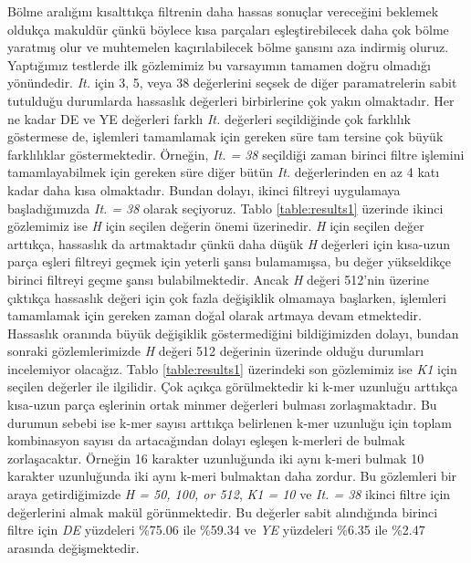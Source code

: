 Bölme aralığını kısalttıkça filtrenin daha hassas sonuçlar vereceğini beklemek oldukça makuldür çünkü böylece kısa parçaları eşleştirebilecek daha çok bölme yaratmış olur ve muhtemelen kaçırılabilecek bölme şansını aza indirmiş oluruz. Yaptığımız testlerde ilk gözlemimiz bu varsayımın tamamen doğru olmadığı yönündedir. \textit{It.} için 3, 5, veya 38 değerlerini seçsek de diğer paramatrelerin sabit tutulduğu durumlarda hassaslık değerleri birbirlerine çok yakın olmaktadır. Her ne kadar DE ve YE değerleri farklı \textit{It.} değerleri seçildiğinde çok farklılık göstermese de, işlemleri tamamlamak için gereken süre tam tersine çok büyük farklılıklar göstermektedir. Örneğin, \textit{It. = 38} seçildiği zaman birinci filtre işlemini tamamlayabilmek için gereken süre diğer bütün \textit{It.} değerlerinden en az 4 katı kadar daha kısa olmaktadır. Bundan dolayı, ikinci filtreyi uygulamaya başladığımızda \textit{It. = 38} olarak seçiyoruz. Tablo \ref{table:results1} üzerinde ikinci gözlemimiz ise \textit{H} için seçilen değerin önemi üzerinedir. \textit{H} için seçilen değer arttıkça, hassaslık da artmaktadır çünkü daha düşük \textit{H} değerleri için kısa-uzun parça eşleri filtreyi geçmek için yeterli şansı bulamamışsa, bu değer yükseldikçe birinci filtreyi geçme şansı bulabilmektedir. Ancak \textit{H} değeri 512'nin üzerine çıktıkça hassaslık değeri için çok fazla değişiklik olmamaya başlarken, işlemleri tamamlamak için gereken zaman doğal olarak artmaya devam etmektedir. Hassaslık oranında büyük değişiklik göstermediğini bildiğimizden dolayı, bundan sonraki gözlemlerimizde \textit{H} değeri 512 değerinin üzerinde olduğu durumları incelemiyor olacağız. Tablo \ref{table:results1} üzerindeki son gözlemimiz ise \textit{K1} için seçilen değerler ile ilgilidir. Çok açıkça görülmektedir ki k-mer uzunluğu arttıkça kısa-uzun parça eşlerinin ortak minmer değerleri bulması zorlaşmaktadır. Bu durumun sebebi ise k-mer sayısı arttıkça belirlenen k-mer uzunluğu için toplam kombinasyon sayısı da artacağından dolayı eşleşen k-merleri de bulmak zorlaşacaktır. Örneğin 16 karakter uzunluğunda iki aynı k-meri bulmak 10 karakter uzunluğunda iki aynı k-meri bulmaktan daha zordur. Bu gözlemleri bir araya getirdiğimizde \textit{H = 50, 100, or 512}, \textit{K1 = 10} ve \textit{It. = 38} ikinci filtre için değerlerini almak makül görünmektedir. Bu değerler sabit alındığında birinci filtre için \textit{DE} yüzdeleri \%75.06 ile \%59.34 ve \textit{YE} yüzdeleri \%6.35 ile \%2.47 arasında değişmektedir.

